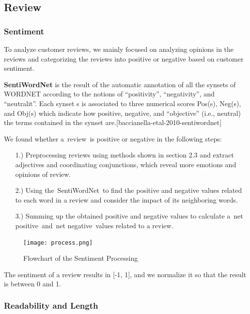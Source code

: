 \documentclass[12pt]{article}  %
\begin{document}
\subsection{Review}
\subsubsection{Sentiment}
To analyze customer reviews, we mainly focused on analyzing opinions in the reviews and categorizing the reviews into positive or negative based on customer sentiment.

\textbf{SentiWordNet}\cite{baccianella-etal-2010-sentiwordnet} is the result of the automatic annotation of all the synsets of WORDNET according to the notions of ``positivity'', ``negativity'', and ``neutralit''. Each synset s is associated to three numerical scores Pos(s), Neg(s), and Obj(s) which indicate how positive, negative, and ``objective'' (i.e., neutral) the terms contained in the synset are.[baccianella-etal-2010-sentiwordnet]

We found whether a review is positive or negative in the following steps:

\begin{enumerate}
	\item[1.)] Preprocessing reviews using methods shown in section 2.3 and extract 
	adjectives and coordinating conjunctions, which reveal more emotions and opinions of review.
	
	\item[2.)] Using the SentiWordNet to find the positive and negative values related to each word in a review and consider the impact of its neighboring words.
	
	\item[3.)] Summing up the obtained positive and negative values to calculate a net positive and net negative values related to a review.
	
\end{enumerate}

\begin{figure}[!htbp]
	\centering
	\texttt{[image: process.png]}
	\caption{Flowchart of the Sentiment Processing}
	\label{fig:fig3}
\end{figure}

The sentiment of a review results in [-1, 1], and we normalize it so that the result is between 0 and 1.


\subsubsection{Readability and Length}
\end{document}
